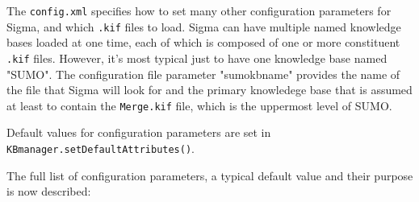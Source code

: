 \documentclass{book}
\begin{document}
The \texttt{config.xml} specifies how to set many other configuration parameters
for Sigma, and which \texttt{.kif} files to load.  Sigma can have multiple named
knowledge bases loaded at one time, each of which is composed of one or more
constituent \texttt{.kif} files.  However, it's most typical just to have one
knowledge base named "SUMO".  The configuration file parameter "sumokbname" provides
the name of the file that Sigma will look for and the primary knowledege base that
is assumed at least to contain the \texttt{Merge.kif} file, which is the uppermost
level of SUMO.

\begin{sloppypar}
Default values for configuration parameters are set in
\texttt{KBmanager.setDefaultAttributes()}.
\end{sloppypar}

The full list of configuration parameters, a typical default value and their
purpose is now described:
\end{document}
